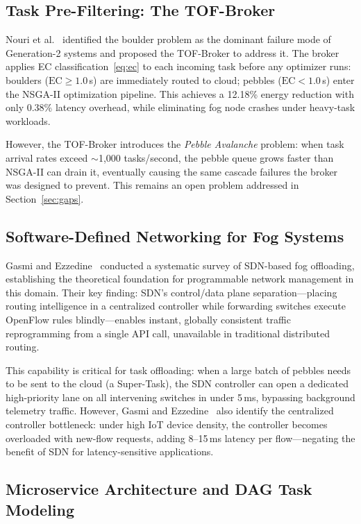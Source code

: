 \documentclass[12pt,a4paper]{article}
\begin{document}
\subsection{Task Pre-Filtering: The TOF-Broker}

Nouri et al.~\cite{nouri2024tof} identified the boulder problem as the dominant
failure mode of Generation-2 systems and proposed the TOF-Broker to address it.
The broker applies EC classification~\eqref{eq:ec} to each incoming task before
any optimizer runs: boulders ($\mathrm{EC} \geq 1.0$\,s) are immediately routed
to cloud; pebbles ($\mathrm{EC} < 1.0$\,s) enter the NSGA-II optimization
pipeline. This achieves a 12.18\% energy reduction with only 0.38\% latency
overhead, while eliminating fog node crashes under heavy-task workloads.

However, the TOF-Broker introduces the \emph{Pebble Avalanche} problem: when
task arrival rates exceed $\sim$1,000 tasks/second, the pebble queue grows faster
than NSGA-II can drain it, eventually causing the same cascade failures the broker
was designed to prevent. This remains an open problem addressed in
Section~\ref{sec:gaps}.

\subsection{Software-Defined Networking for Fog Systems}

Gasmi and Ezzedine~\cite{gasmi2024sdn} conducted a systematic survey of SDN-based
fog offloading, establishing the theoretical foundation for programmable network
management in this domain. Their key finding: SDN's control/data plane
separation---placing routing intelligence in a centralized controller while
forwarding switches execute OpenFlow rules blindly---enables instant, globally
consistent traffic reprogramming from a single API call, unavailable in traditional
distributed routing.

This capability is critical for task offloading: when a large batch of pebbles
needs to be sent to the cloud (a Super-Task), the SDN controller can open a
dedicated high-priority lane on all intervening switches in under 5\,ms, bypassing
background telemetry traffic. However, Gasmi and Ezzedine~\cite{gasmi2024sdn}
also identify the centralized controller bottleneck: under high IoT device density,
the controller becomes overloaded with new-flow requests, adding 8--15\,ms latency
per flow---negating the benefit of SDN for latency-sensitive applications.

\subsection{Microservice Architecture and DAG Task Modeling}
\end{document}
